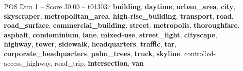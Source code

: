 \begin{textsample}{POS Dim 1 – Score 30.00 – t013037}  \label{ex:f1_pos_001}
\textbf{building}, \textbf{daytime}, \textbf{urban\_area}, \textbf{city}, \textbf{skyscraper}, \textbf{metropolitan\_area}, \textbf{high-rise\_building}, \textbf{transport}, \textbf{road}, \textbf{road\_surface}, \textbf{commercial\_building}, \textbf{street}, \textbf{metropolis}, \textbf{thoroughfare}, \textbf{asphalt}, \textbf{condominium}, \textbf{lane}, \textbf{mixed-use}, \textbf{street\_light}, \textbf{cityscape}, \textbf{highway}, \textbf{tower}, \textbf{sidewalk}, \textbf{headquarters}, \textbf{traffic}, \textbf{tar}, \textbf{corporate\_headquarters}, \textbf{palm\_trees}, \textbf{truck}, \textbf{skyline}, controlled-access\_highway, road\_trip, \textbf{intersection}, \textbf{van}

\end{textsample}
